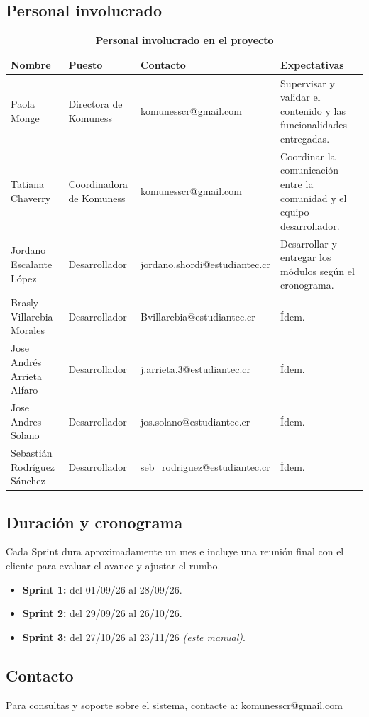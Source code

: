 \subsection{Personal involucrado}
\begin{table}[H]
\centering
\small
\begin{tabular}{|p{4.2cm}|p{3.4cm}|p{4.2cm}|p{3cm}|}
\hline
\textbf{Nombre} & \textbf{Puesto} & \textbf{Contacto} & \textbf{Expectativas} \\
\hline
Paola Monge & Directora de Komuness & komunesscr@gmail.com & Supervisar y validar el contenido y las funcionalidades entregadas. \\
\hline
Tatiana Chaverry & Coordinadora de Komuness & komunesscr@gmail.com & Coordinar la comunicación entre la comunidad y el equipo desarrollador. \\
\hline
Jordano Escalante López & Desarrollador & jordano.shordi@estudiantec.cr & Desarrollar y entregar los módulos según el cronograma. \\
\hline
Brasly Villarebia Morales & Desarrollador & Bvillarebia@estudiantec.cr & Ídem. \\
\hline
Jose Andrés Arrieta Alfaro & Desarrollador & j.arrieta.3@estudiantec.cr & Ídem. \\
\hline
Jose Andres Solano & Desarrollador & jos.solano@estudiantec.cr & Ídem. \\
\hline
Sebastián Rodríguez Sánchez & Desarrollador & seb\_rodriguez@estudiantec.cr & Ídem. \\
\hline
\end{tabular}
\caption{\textbf{Personal involucrado en el proyecto}}
\end{table}

\subsection{Duración y cronograma}
Cada Sprint dura aproximadamente un mes e incluye una reunión final con el cliente para evaluar el avance y ajustar el rumbo.
\begin{itemize}
    \item \textbf{Sprint 1:} del 01/09/26 al 28/09/26.
    \item \textbf{Sprint 2:} del 29/09/26 al 26/10/26.
    \item \textbf{Sprint 3:} del 27/10/26 al 23/11/26 \textit{(este manual)}.
\end{itemize}

\subsection{Contacto}
Para consultas y soporte sobre el sistema, contacte a: komunesscr@gmail.com

